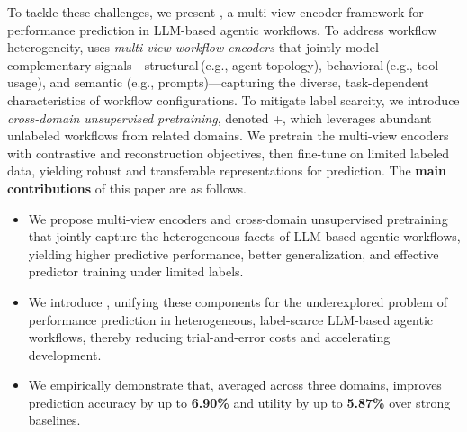 
To tackle these challenges, we present \textbf{\ours{}}, a multi-view encoder framework for performance prediction in LLM-based agentic workflows. To address workflow heterogeneity, \ours{} uses \emph{multi-view workflow encoders} that jointly model complementary signals---structural\,(e.g., agent topology), behavioral\,(e.g., tool usage), and semantic (e.g., prompts)---capturing the diverse, task-dependent characteristics of workflow configurations. To mitigate label scarcity, we introduce \emph{cross-domain unsupervised pretraining}, denoted \ours{}+, which leverages abundant unlabeled workflows from related domains. We pretrain the multi-view encoders with contrastive and reconstruction objectives, then fine-tune on limited labeled data, yielding robust and transferable representations for prediction. The \textbf{main contributions} of this paper are as follows.

\begin{itemize}[leftmargin=10pt, nosep, noitemsep]
    \item We propose multi-view encoders and cross-domain unsupervised pretraining that jointly capture the heterogeneous facets of LLM-based agentic workflows, yielding higher predictive performance, better generalization, and effective predictor training under limited labels.    
    
    \item We introduce \ours{}, unifying these components for the underexplored problem of performance prediction in heterogeneous, label-scarce LLM-based agentic workflows, thereby reducing trial-and-error costs and accelerating development.
    
    \item We empirically demonstrate that, averaged across three domains, \ours{} improves prediction accuracy by up to \textbf{6.90\%} and utility by up to \textbf{5.87\%} over strong baselines.
\end{itemize}



